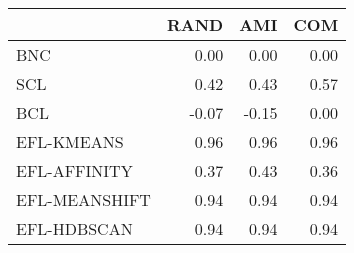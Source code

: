 \begin{tabular}{lrrr}
\toprule
 & RAND & AMI & COM \\
\midrule
BNC & 0.00 & 0.00 & 0.00 \\
SCL & 0.42 & 0.43 & 0.57 \\
BCL & -0.07 & -0.15 & 0.00 \\
EFL-KMEANS & 0.96 & 0.96 & 0.96 \\
EFL-AFFINITY & 0.37 & 0.43 & 0.36 \\
EFL-MEANSHIFT & 0.94 & 0.94 & 0.94 \\
EFL-HDBSCAN & 0.94 & 0.94 & 0.94 \\
\bottomrule
\end{tabular}
